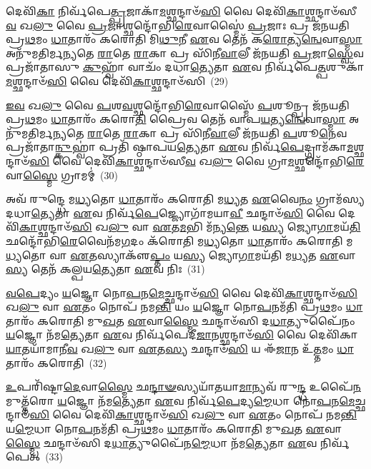 𑌦𑍇𑌵𑌿᳴\-\ul{𑌕𑌾} 𑌨𑌿𑌰𑍍𑌵᳴𑌪𑍇\-\ul{𑌤𑍍𑌪𑍍𑌰}\-𑌜𑌾𑌕𑌾᳴\-\ul{𑌮}\-𑌶𑍍𑌛𑌨𑍍𑌦𑌾𑍞᳴\-\ul{𑌸𑌿} 𑌵𑍈 𑌦𑍇𑌵𑌿᳴\-\ul{𑌕𑌾}\-𑌶𑍍𑌛𑌨𑍍𑌦𑌾𑍞᳴𑌸𑍀\-\ul{𑌵} 𑌖\-\ul{𑌲𑍁} 𑌵𑍈 \ul{𑌪𑍍𑌰}\-𑌜𑌾𑌶𑍍𑌛𑌨𑍍𑌦𑍋᳴𑌭𑌿\-\ul{𑌰𑍇}\-𑌵𑌾𑌸𑍍𑌮𑍈॑ \ul{𑌪𑍍𑌰}\-𑌜𑌾𑌃 𑌪𑍍𑌰 𑌜᳴𑌨𑌯𑌤𑌿 𑌪𑍍𑌰\-\ul{𑌥}\-𑌮𑌂 \ul{𑌧𑌾}\-𑌤𑌾𑌰𑌂᳴ 𑌕𑌰𑍋𑌤𑌿 𑌮𑌿\-\ul{𑌥𑍁}\-𑌨𑍀 \ul{𑌏}\-𑌵 𑌤𑍇𑌨᳴ 𑌕\-\ul{𑌰𑍋}\-𑌤𑍍𑌯\-\ul{𑌨𑍍𑌵𑍇}\-𑌵𑌾\-\ul{𑌸𑍍𑌮𑌾} 𑌅𑌨𑍁᳴𑌮𑌤𑌿𑌰𑍍𑌮𑌨𑍍𑌯𑌤𑍇 \ul{𑌰𑌾}\-𑌤𑍇 \ul{𑌰𑌾}\-𑌕𑌾 𑌪𑍍𑌰 𑌸𑌿᳴𑌨𑍀\-\ul{𑌵𑌾}\-𑌲𑍀 𑌜᳴𑌨𑌯𑌤𑌿 \ul{𑌪𑍍𑌰}\-𑌜𑌾\-\ul{𑌸𑍍𑌵𑍇}\-𑌵 𑌪𑍍𑌰𑌜𑌾᳴𑌤𑌾𑌸𑍁 \ul{𑌕𑍁}\-𑌹𑍍𑌵𑌾᳴ 𑌵𑌾𑌚𑌂᳴ 𑌦𑌧𑌾\-\ul{𑌤𑍍𑌯𑍇}\-𑌤𑌾 \ul{𑌏}\-𑌵 𑌨𑌿𑌰𑍍𑌵᳴𑌪𑍇\-\ul{𑌤𑍍𑌪}\-𑌶𑍁𑌕𑌾᳴\-\ul{𑌮}\-𑌶𑍍𑌛𑌨𑍍𑌦𑌾𑍞᳴\-\ul{𑌸𑌿} 𑌵𑍈 𑌦𑍇𑌵𑌿᳴\-\ul{𑌕𑌾}\-𑌶𑍍𑌛𑌨𑍍𑌦𑌾𑍞᳴𑌸𑌿~(29)

\-\ul{𑌇}\-\-\ul{𑌵} 𑌖\-\ul{𑌲𑍁} 𑌵𑍈 \ul{𑌪}\-𑌶\-\ul{𑌵}\-𑌶𑍍𑌛𑌨𑍍𑌦𑍋᳴𑌭𑌿\-\ul{𑌰𑍇}\-𑌵𑌾𑌸𑍍𑌮𑍈᳴ \ul{𑌪}\-𑌶𑍂𑌨𑍍𑌪𑍍𑌰 𑌜᳴𑌨𑌯𑌤𑌿 𑌪𑍍𑌰\-\ul{𑌥}\-𑌮𑌂 \ul{𑌧𑌾}\-𑌤𑌾𑌰𑌂᳴ 𑌕𑌰𑍋\-\ul{𑌤𑌿} 𑌪𑍍𑌰𑍈𑌵 𑌤𑍇𑌨᳴ 𑌵𑌾𑌪\-\ul{𑌯}\-𑌤𑍍𑌯\-\ul{𑌨𑍍𑌵𑍇}\-𑌵𑌾\-\ul{𑌸𑍍𑌮𑌾} 𑌅𑌨𑍁᳴𑌮𑌤𑌿𑌰𑍍𑌮𑌨𑍍𑌯𑌤𑍇 \ul{𑌰𑌾}\-𑌤𑍇 \ul{𑌰𑌾}\-𑌕𑌾 𑌪𑍍𑌰 𑌸𑌿᳴𑌨𑍀\-\ul{𑌵𑌾}\-𑌲𑍀 𑌜᳴𑌨𑌯𑌤𑌿 \ul{𑌪}\-𑌶𑍂\-\ul{𑌨𑍇}\-𑌵 𑌪𑍍𑌰𑌜𑌾᳴𑌤𑌾\-\ul{𑌨𑍍𑌕𑍁}\-𑌹𑍍𑌵𑌾॑ 𑌪𑍍𑌰𑌤𑌿᳴ 𑌷𑍍𑌠𑌾𑌪𑌯\-\ul{𑌤𑍍𑌯𑍇}\-𑌤𑌾 \ul{𑌏}\-𑌵 𑌨𑌿𑌰𑍍𑌵᳴\-\ul{𑌪𑍇}\-𑌦𑍍𑌗𑍍𑌰𑌾𑌮᳴𑌕𑌾\-\ul{𑌮}\-𑌶𑍍𑌛𑌨𑍍𑌦𑌾𑍞᳴\-\ul{𑌸𑌿} 𑌵𑍈 𑌦𑍇𑌵𑌿᳴\-\ul{𑌕𑌾}\-𑌶𑍍𑌛𑌨𑍍𑌦𑌾𑍞᳴𑌸𑍀\-\ul{𑌵} 𑌖\-\ul{𑌲𑍁} 𑌵𑍈 𑌗𑍍𑌰𑌾\-\ul{𑌮}\-𑌶𑍍𑌛𑌨𑍍𑌦𑍋᳴𑌭𑌿\-\ul{𑌰𑍇}\-𑌵𑌾\-\ul{𑌸𑍍𑌮𑍈} 𑌗𑍍𑌰𑌾𑌮𑌮𑍍॑~(30)

𑌅𑌵᳴ 𑌰𑍁𑌨𑍍𑌦𑍍𑌧𑍇 𑌮\-\ul{𑌧𑍍𑌯}\-𑌤𑍋 \ul{𑌧𑌾}\-𑌤𑌾𑌰𑌂᳴ 𑌕𑌰𑍋𑌤𑌿 𑌮\-\ul{𑌧𑍍𑌯}\-𑌤 \ul{𑌏}\-𑌵𑍈\-\ul{𑌨𑌂} 𑌗𑍍𑌰𑌾𑌮᳴𑌸𑍍𑌯 𑌦𑌧𑌾\-\ul{𑌤𑍍𑌯𑍇}\-𑌤𑌾 \ul{𑌏}\-𑌵 𑌨𑌿𑌰𑍍𑌵᳴\-\ul{𑌪𑍇}\-𑌜𑍍𑌜𑍍𑌯𑍋𑌗𑌾᳴𑌮𑌯𑌾\-\ul{𑌵𑍀} 𑌛𑌨𑍍𑌦𑌾𑍞᳴\-\ul{𑌸𑌿} 𑌵𑍈 𑌦𑍇𑌵𑌿᳴\-\ul{𑌕𑌾}\-𑌶𑍍𑌛𑌨𑍍𑌦𑌾𑍞᳴\-\ul{𑌸𑌿} 𑌖\-\ul{𑌲𑍁} 𑌵𑌾 \ul{𑌏}\-𑌤\-\ul{𑌮}\-𑌭𑌿 𑌮᳴𑌨𑍍𑌯\-\ul{𑌨𑍍𑌤𑍇} 𑌯\-\ul{𑌸𑍍𑌯} 𑌜𑍍𑌯𑍋\-\ul{𑌗𑌾}\-𑌮𑌯᳴\-\ul{𑌤𑌿} 𑌛𑌨𑍍𑌦𑍋᳴𑌭𑌿\-\ul{𑌰𑍇}\-𑌵𑍈𑌨᳴𑌮\-\ul{𑌗}\-𑌦𑌂 𑌕᳴𑌰𑍋𑌤𑌿 𑌮\-\ul{𑌧𑍍𑌯}\-𑌤𑍋 \ul{𑌧𑌾}\-𑌤𑌾𑌰𑌂᳴ 𑌕𑌰𑍋𑌤𑌿 𑌮\-\ul{𑌧𑍍𑌯}\-𑌤𑍋 𑌵𑌾 \ul{𑌏}\-𑌤𑌸𑍍𑌯𑌾𑌕𑍢᳴\-\ul{𑌪𑍍𑌤𑌂} 𑌯\-\ul{𑌸𑍍𑌯} 𑌜𑍍𑌯𑍋\-\ul{𑌗𑌾}\-𑌮𑌯᳴𑌤𑌿 𑌮\-\ul{𑌧𑍍𑌯}\-𑌤 \ul{𑌏}\-𑌵𑌾\-\ul{𑌸𑍍𑌯} 𑌤𑍇𑌨᳴ 𑌕𑌲𑍍𑌪𑌯\-\ul{𑌤𑍍𑌯𑍇}\-𑌤𑌾 \ul{𑌏}\-𑌵 𑌨𑌿𑌃~(31)

\-\ul{𑌵}\-\-\ul{𑌪𑍇}\-𑌦𑍍𑌯𑌂 \ul{𑌯}\-𑌜𑍍𑌞𑍋 𑌨𑍋\-\ul{𑌪}\-𑌨\-\ul{𑌮𑍇}\-𑌚𑍍𑌛𑌨𑍍𑌦𑌾𑍞᳴\-\ul{𑌸𑌿} 𑌵𑍈 𑌦𑍇𑌵𑌿᳴\-\ul{𑌕𑌾}\-𑌶𑍍𑌛𑌨𑍍𑌦𑌾𑍞᳴\-\ul{𑌸𑌿} 𑌖\-\ul{𑌲𑍁} 𑌵𑌾 \ul{𑌏}\-𑌤𑌂 𑌨𑍋𑌪᳴ 𑌨𑌮\-\ul{𑌨𑍍𑌤𑌿} 𑌯𑌂 \ul{𑌯}\-𑌜𑍍𑌞𑍋 𑌨𑍋\-\ul{𑌪}\-𑌨𑌮᳴𑌤𑌿 𑌪𑍍𑌰\-\ul{𑌥}\-𑌮𑌂 \ul{𑌧𑌾}\-𑌤𑌾𑌰𑌂᳴ 𑌕𑌰𑍋𑌤𑌿 𑌮𑍁\-\ul{𑌖}\-𑌤 \ul{𑌏}\-𑌵𑌾\-\ul{𑌸𑍍𑌮𑍈} 𑌛𑌨𑍍𑌦𑌾𑍞᳴𑌸𑌿 𑌦\-\ul{𑌧𑌾}\-𑌤𑍍𑌯𑍁𑌪𑍈᳴𑌨𑌂 \ul{𑌯}\-𑌜𑍍𑌞𑍋 𑌨᳴𑌮\-\ul{𑌤𑍍𑌯𑍇}\-𑌤𑌾 \ul{𑌏}\-𑌵 𑌨𑌿𑌰𑍍𑌵᳴𑌪𑍇𑌦𑍀\-\ul{𑌜𑌾}\-𑌨𑌶𑍍𑌛𑌨𑍍𑌦𑌾𑍞᳴\-\ul{𑌸𑌿} 𑌵𑍈 𑌦𑍇𑌵𑌿᳴𑌕𑌾 \ul{𑌯𑌾}\-𑌤𑌯𑌾᳴𑌮𑌾𑌨𑍀\-\ul{𑌵} 𑌖\-\ul{𑌲𑍁} 𑌵𑌾 \ul{𑌏}\-𑌤\-\ul{𑌸𑍍𑌯} 𑌛𑌨𑍍𑌦𑌾𑍞᳴\-\ul{𑌸𑌿} 𑌯 𑌈᳴\-\ul{𑌜𑌾}\-𑌨 𑌉᳴\-\ul{𑌤𑍍𑌤}\-𑌮𑌂 \ul{𑌧𑌾}\-𑌤𑌾𑌰𑌂᳴ 𑌕𑌰𑍋𑌤𑌿~(32)

\-\ul{𑌉}\-𑌪𑌰𑌿᳴𑌷𑍍𑌟𑌾\-\ul{𑌦𑍇}\-𑌵𑌾\-\ul{𑌸𑍍𑌮𑍈} 𑌛\-\ul{𑌨𑍍𑌦𑌾}\-\-\ul{𑍟}\-𑌸𑍍𑌯𑌯𑌾᳴𑌤𑌯𑌾\-\ul{𑌮𑌾}\-𑌨𑍍𑌯𑌵᳴ 𑌰𑍁\-\ul{𑌨𑍍𑌦𑍍𑌧} 𑌉𑌪𑍈᳴\-\ul{𑌨}\-𑌮𑍁𑌤𑍍𑌤᳴𑌰𑍋 \ul{𑌯}\-𑌜𑍍𑌞𑍋 𑌨᳴𑌮\-\ul{𑌤𑍍𑌯𑍇}\-𑌤𑌾 \ul{𑌏}\-𑌵 𑌨𑌿𑌰𑍍𑌵᳴\-\ul{𑌪𑍇}\-𑌦𑍍𑌯\-\ul{𑌮𑍍𑌮𑍇}\-𑌧𑌾 𑌨𑍋\-\ul{𑌪}\-𑌨\-\ul{𑌮𑍇}\-𑌚𑍍𑌛𑌨𑍍𑌦𑌾𑍞᳴\-\ul{𑌸𑌿} 𑌵𑍈 𑌦𑍇𑌵𑌿᳴\-\ul{𑌕𑌾}\-𑌶𑍍𑌛𑌨𑍍𑌦𑌾𑍞᳴\-\ul{𑌸𑌿} 𑌖\-\ul{𑌲𑍁} 𑌵𑌾 \ul{𑌏}\-𑌤𑌂 𑌨𑍋𑌪᳴ 𑌨𑌮\-\ul{𑌨𑍍𑌤𑌿} 𑌯\-\ul{𑌮𑍍𑌮𑍇}\-𑌧𑌾 𑌨𑍋\-\ul{𑌪}\-𑌨𑌮᳴𑌤𑌿 𑌪𑍍𑌰\-\ul{𑌥}\-𑌮𑌂 \ul{𑌧𑌾}\-𑌤𑌾𑌰𑌂᳴ 𑌕𑌰𑍋𑌤𑌿 𑌮𑍁\-\ul{𑌖}\-𑌤 \ul{𑌏}\-𑌵𑌾\-\ul{𑌸𑍍𑌮𑍈} 𑌛𑌨𑍍𑌦𑌾𑍞᳴𑌸𑌿 𑌦\-\ul{𑌧𑌾}\-𑌤𑍍𑌯𑍁𑌪𑍈᳴𑌨\-\ul{𑌮𑍍𑌮𑍇}\-𑌧𑌾 𑌨᳴𑌮\-\ul{𑌤𑍍𑌯𑍇}\-𑌤𑌾 \ul{𑌏}\-𑌵 𑌨𑌿𑌰𑍍𑌵᳴𑌪𑍇𑌤𑍍~(33)


